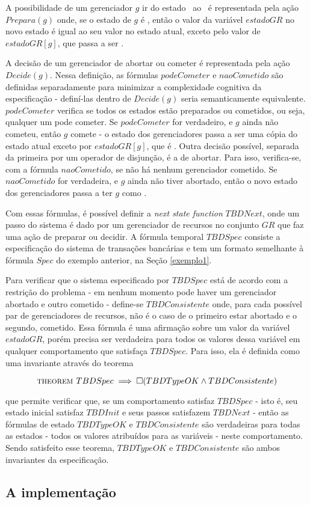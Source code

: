 A possibilidade de um gerenciador $g$ ir do estado \trabalhando\ ao \preparado\ é representada pela ação $Prepara(g)$ onde, se o estado de $g$ é \trabalhando, então o valor da variável $estadoGR$ no novo estado é igual ao seu valor no estado atual, exceto pelo valor de $estadoGR[g]$, que passa a ser \preparado.

A decisão de um gerenciador de abortar ou cometer é representada pela ação $Decide(g)$. Nessa definição, as fórmulas $podeCometer$ e $naoCometido$ são definidas separadamente para minimizar a complexidade cognitiva da especificação - definí-las dentro de $Decide(g)$ seria semanticamente equivalente. $podeCometer$ verifica se todos os estados estão preparados ou cometidos, ou seja, qualquer um pode cometer. Se $podeCometer$ for verdadeiro, e $g$ ainda não cometeu, então $g$ comete - o estado dos gerenciadores passa a ser uma cópia do estado atual exceto por $estadoGR[g]$, que é \cometido. Outra decisão possível, separada da primeira por um operador de disjunção, é a de abortar. Para isso, verifica-se, com a fórmula $naoCometido$, se não há nenhum gerenciador cometido. Se $naoCometido$ for verdadeira, e $g$ ainda não tiver abortado, então o novo estado dos gerenciadores passa a ter $g$ como \abortado.

Com essas fórmulas, é possível definir a \textit{next state function} $TBDNext$, onde um passo do sistema é dado por um gerenciador de recursos no conjunto $GR$ que faz uma ação de preparar ou decidir. A fórmula temporal $TBDSpec$ consiste a especificação do sistema de transações bancárias e tem um formato semelhante à fórmula $Spec$ do exemplo anterior, na Seção \ref{exemplo1}.

Para verificar que o sistema especificado por $TBDSpec$ está de acordo com a restrição do problema - em nenhum momento pode haver um gerenciador abortado e outro cometido - define-se $TBDConsistente$ onde, para cada possível par de gerenciadores de recursos, não é o caso de o primeiro estar abortado e o segundo, cometido. Essa fórmula é uma afirmação sobre um valor da variável $estadoGR$, porém precisa ser verdadeira para todos os valores dessa variável em qualquer comportamento que satisfaça $TBDSpec$. Para isso, ela é definida como uma invariante através do teorema

\[\textsc{theorem } TBDSpec \implies \square(TBDTypeOK \land TBDConsistente)\]

que permite verificar que, se um comportamento satisfaz $TBDSpec$ - isto é, seu estado inicial satisfaz $TBDInit$ e seus passos satisfazem $TBDNext$ - então as fórmulas de estado $TBDTypeOK$ e $TBDConsistente$ são verdadeiras para todas as estados - todos os valores atribuídos para as variáveis - neste comportamento. Sendo satisfeito esse teorema, $TBDTypeOK$ e $TBDConsistente$ são ambos invariantes da especificação.

\subsection{A implementação}
